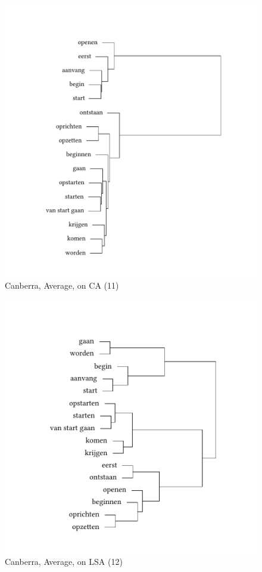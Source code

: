 \begin{figure}
\includegraphics[height=.4\textheight]{figures/tree40.pdf}
\caption{\label{fig:3:40}  Canberra, Average, on CA (11)}
\end{figure}

\begin{figure}
\includegraphics[height=.4\textheight]{figures/tree41.pdf}
\caption{\label{fig:3:41}  Canberra, Average, on LSA (12)}
\end{figure}

